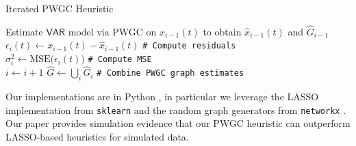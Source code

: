 \documentclass[12pt]{article}
\def\VAR{\mathsf{VAR}}  %
\begin{document}
\begin{algorithm}
  \DontPrintSemicolon

  \BlankLine
  \caption{Iterated PWGC Heuristic}
  \label{alg:iterated_pwgc}
  

   {
    Estimate $\VAR$ model via PWGC on $x_{i - 1}(t)$ to obtain $\widehat{x}_{i - 1}(t)$ and $\widehat{G}_{i - 1}$\\
    $\epsilon_i(t) \leftarrow x_{i - 1}(t) - \widehat{x}_{i - 1}(t)$ \texttt{\# Compute residuals}\\
    $\sigma_i^2 \leftarrow \text{MSE}\big(\epsilon_i(t)\big)$ \texttt{\# Compute MSE}\\
    $i \leftarrow i + 1$
  }
  $\widehat{G} \leftarrow \bigcup_{i} \widehat{G}_{i}$ \texttt{\# Combine PWGC graph estimates}\\
\end{algorithm}

Our implementations are in Python \cite{scipy}, in particular we
leverage the LASSO implementation from \texttt{sklearn} \cite{sklearn}
and the random graph generators from \texttt{networkx}
\cite{networkx}.  Our paper \cite{my_GC_paper} provides simulation
evidence that our PWGC heuristic can outperform LASSO-based heuristics
for simulated data.

\end{document}
